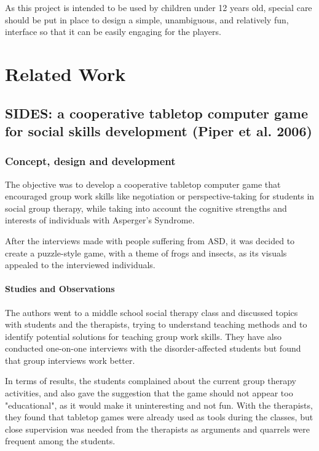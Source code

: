 \documentclass[runningheads]{llncs}
\begin{document}
\par As this project is intended to be used by children under 12 years old, special care should be put in place to design a simple, unambiguous, and relatively fun, interface so that it can be easily engaging for the players. 

\newpage
\section{Related Work}


\subsection{SIDES: a cooperative tabletop computer game for social skills development (Piper et al. 2006)}

\subsubsection{Concept, design and development}

\par The objective was to develop a cooperative tabletop computer game that encouraged group work skills like negotiation or perspective-taking for students in social group therapy, while taking into account the cognitive strengths and interests of individuals with Asperger's Syndrome.
\par After the interviews made with people suffering from ASD, it was decided to create a puzzle-style game, with a theme of frogs and insects, as its visuals appealed to the interviewed individuals.

\paragraph{Studies and Observations} The authors went to a middle school social therapy class and discussed topics with students and the therapists, trying to understand teaching methods and to identify potential solutions for teaching group work skills. They have also conducted one-on-one interviews with the disorder-affected students but found that group interviews work better. 
\par In terms of results, the students complained about the current group therapy activities, and also gave the suggestion that the game should not appear too "educational", as it would make it uninteresting and not fun. With the therapists, they found that tabletop games were already used as tools during the classes, but close supervision was needed from the therapists as arguments and quarrels were frequent among the students.
\end{document}
